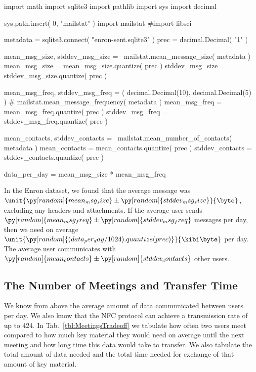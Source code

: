 \begin{pycode}[random]
import math
import sqlite3
import pathlib
import sys
import decimal

sys.path.insert( 0, "mailstat" )
import mailstat
#import libsci

metadata = sqlite3.connect( "enron-sent.sqlite3" )
prec = decimal.Decimal( "1" )

mean_msg_size, stddev_msg_size = \
  mailstat.mean_message_size( metadata )
mean_msg_size = mean_msg_size.quantize( prec )
stddev_msg_size = stddev_msg_size.quantize( prec )

mean_msg_freq, stddev_msg_freq = ( decimal.Decimal(10), decimal.Decimal(5) )
#  mailstat.mean_message_frequency( metadata )
mean_msg_freq = mean_msg_freq.quantize( prec )
stddev_msg_freq = stddev_msg_freq.quantize( prec )

mean_contacts, stddev_contacts = \
  mailstat.mean_number_of_contacts( metadata )
mean_contacts = mean_contacts.quantize( prec )
stddev_contacts = stddev_contacts.quantize( prec )

data_per_day = mean_msg_size * mean_msg_freq
\end{pycode}

In the Enron dataset, we found that the average message was
\(\unit{\py[random]{mean_msg_size}\pm
\py[random]{stddev_msg_size}}{\byte}\),
excluding any headers and attachments.
If the average user sends
\(\py[random]{mean_msg_freq}\pm
\py[random]{stddev_msg_freq}\)
messages per day, then we need on average
\(\unit{\py[random]{(data_per_day/1024).quantize( prec )}}{\kibi\byte}\)
per day.
The average user communicates with
\(\py[random]{mean_contacts}\pm
\py[random]{stddev_contacts}\)
other users.

\subsection{The Number of Meetings and Transfer Time}
\label{sec:Meetings}
We know from above the average amount of data communicated between users per 
day.
We also know that the \ac{NFC} protocol can achieve a transmission rate of up 
to \unit{424}{\kilo\bit\per\second}.
In Tab.~\ref{tbl:MeetingsTradeoff} we tabulate how often two users meet 
compared to how much key material they would need on average until the next 
meeting and how long time this data would take to transfer.
We also tabulate the total amount of data needed and the total time needed for 
exchange of that amount of key material.

